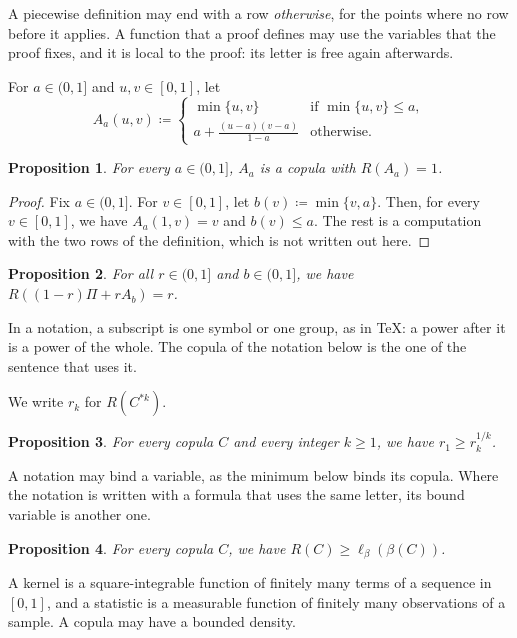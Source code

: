 \documentclass{article}
\newtheorem{proposition}{Proposition}
\begin{document}
A piecewise definition may end with a row \emph{otherwise}, for the points where no row
before it applies. A function that a proof defines may use the variables that the proof
fixes, and it is local to the proof: its letter is free again afterwards.

For $a\in(0,1]$ and $u,v\in[0,1]$, let
\[
A_a(u,v)\coloneqq\begin{cases}\min\{u,v\}&\text{if }\min\{u,v\}\le a,\\ a+\frac{(u-a)(v-a)}{1-a}&\text{otherwise.}\end{cases}
\]

\begin{proposition}\label{p21}
For every $a\in(0,1]$, $A_a$ is a copula with $R(A_a)=1$.
\end{proposition}

\begin{proof}
Fix $a\in(0,1]$.
For $v\in[0,1]$, let $b(v)\coloneqq\min\{v,a\}$.
Then, for every $v\in[0,1]$, we have $A_a(1,v)=v$ and $b(v)\le a$.
The rest is a computation with the two rows of the definition, which is not written out here.
\end{proof}

\begin{proposition}\label{p22}
For all $r\in(0,1]$ and $b\in(0,1]$, we have $R((1-r)\Pi+rA_b)=r$.
\end{proposition}

In a notation, a subscript is one symbol or one group, as in \TeX: a power after it is a
power of the whole. The copula of the notation below is the one of the sentence that uses it.

We write $r_k$ for $R(C^{\ast k})$.

\begin{proposition}\label{p23}
For every copula $C$ and every integer $k\ge1$, we have $r_1\ge r_k^{1/k}$.
\end{proposition}

A notation may bind a variable, as the minimum below binds its copula. Where the notation
is written with a formula that uses the same letter, its bound variable is another one.

\begin{proposition}\label{p24}
For every copula $C$, we have $R(C)\ge\ell_\beta(\beta(C))$.
\end{proposition}

A kernel is a square-integrable function of finitely many terms of a sequence in $[0,1]$,
and a statistic is a measurable function of finitely many observations of a sample. A
copula may have a bounded density.
\end{document}
